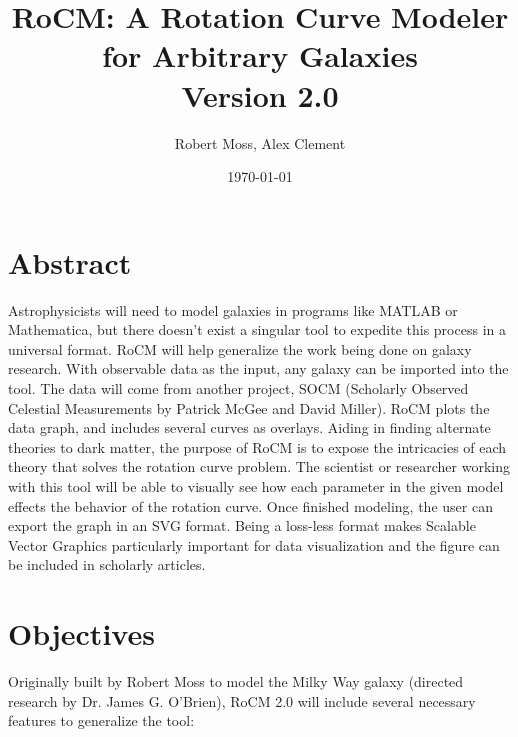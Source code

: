 \documentclass[12pt]{article}
\title{RoCM: A Rotation Curve Modeler for Arbitrary Galaxies\\\normalsize Version 2.0}
\author{Robert Moss, Alex Clement}
\date{\today}
\begin{document}
\maketitle

\section{Abstract}

Astrophysicists will need to model galaxies in programs like MATLAB or Mathematica, but there doesn't exist a singular tool to expedite this process in a universal format. RoCM will help generalize the work being done on galaxy research.  With observable data as the input, any galaxy can be imported into the tool. The data will come from another project, SOCM (Scholarly Observed Celestial Measurements by Patrick McGee and David Miller). RoCM plots the data graph, and includes several curves as overlays. Aiding in finding alternate theories to dark matter, the purpose of RoCM is to expose the intricacies of each theory that solves the rotation curve problem. The scientist or researcher working with this tool will be able to visually see how each parameter in the given model effects the behavior of the rotation curve. Once finished modeling, the user can export the graph in an SVG format. Being a loss-less format makes Scalable Vector Graphics particularly important for data visualization and the figure can be included in scholarly articles.

\section{Objectives}

Originally built by Robert Moss to model the Milky Way galaxy (directed research by Dr. James G. O'Brien), RoCM 2.0 will include several necessary features to generalize the tool:
\end{document}
